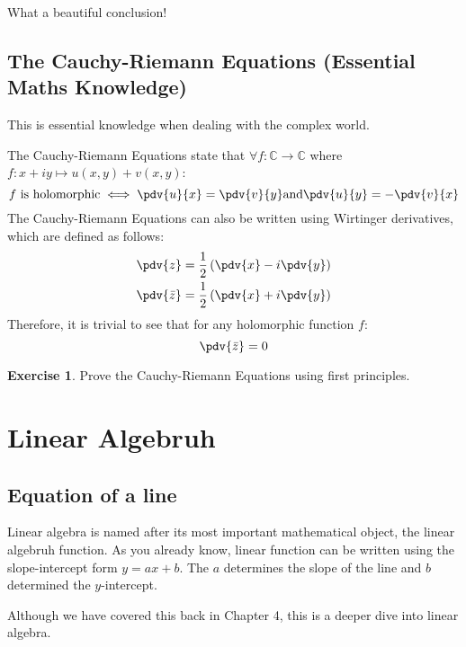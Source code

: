 \documentclass[a4paper]{article}
\theoremstyle{plain}
\theoremstyle{definition}
\newtheorem{exercise}{Exercise}[section]
\theoremstyle{remark}
\newcommand{\sectionSpace}{\vspace{2em}} %
\newcommand{\subsectionSpace}{\vspace{0.5em}}
\begin{document}
    What a beautiful conclusion!
    
    \subsectionSpace
    \subsection{The Cauchy-Riemann Equations (Essential Maths Knowledge)}
    This is essential knowledge when dealing with the complex world.

    The Cauchy-Riemann Equations state that $\forall f:\mathbb{C}\to\mathbb{C}$ where $f:x+iy\mapsto u(x,y)+v(x,y)$:
    $$f \text{ is holomorphic} \iff \pdv{u}{x} = \pdv{v}{y} \text{and}\pdv{u}{y} = -\pdv{v}{x}$$
    The Cauchy-Riemann Equations can also be written using Wirtinger derivatives, which are defined as follows:
    \begin{align}
        \pdv{z} & = {\frac {1}{2}}\left(\pdv{x}-i\pdv{y}\right) \\
        \pdv{\bar z} & = {\frac {1}{2}}\left(\pdv{x}+i\pdv{y}\right)
    \end{align}
    Therefore, it is trivial to see that for any holomorphic function $f$:
    $$ \pdv{\bar z} = 0$$
    \begin{exercise}
        Prove the Cauchy-Riemann Equations using first principles.
    \end{exercise}

\sectionSpace
\section{Linear Algebruh}
    \subsection{Equation of a line}
    Linear algebra is named after its most important mathematical object, the linear algebruh function. As you already know, linear function can be written using the slope-intercept form $y=ax+b$. The $a$ determines the slope of the line and $b$ determined the $y$-intercept.

    Although we have covered this back in Chapter 4, this is a deeper dive into linear algebra.
\end{document}

